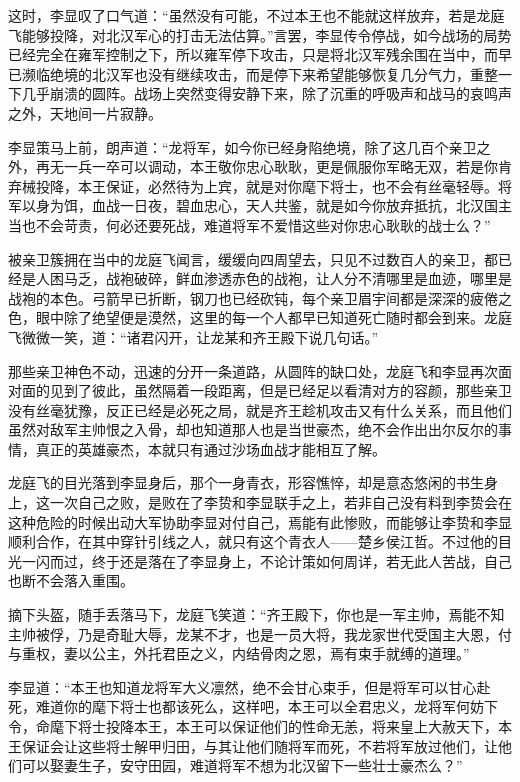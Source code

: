 这时，李显叹了口气道：“虽然没有可能，不过本王也不能就这样放弃，若是龙庭飞能够投降，对北汉军心的打击无法估算。”言罢，李显传令停战，如今战场的局势已经完全在雍军控制之下，所以雍军停下攻击，只是将北汉军残余围在当中，而早已濒临绝境的北汉军也没有继续攻击，而是停下来希望能够恢复几分气力，重整一下几乎崩溃的圆阵。战场上突然变得安静下来，除了沉重的呼吸声和战马的哀鸣声之外，天地间一片寂静。

李显策马上前，朗声道：“龙将军，如今你已经身陷绝境，除了这几百个亲卫之外，再无一兵一卒可以调动，本王敬你忠心耿耿，更是佩服你军略无双，若是你肯弃械投降，本王保证，必然待为上宾，就是对你麾下将士，也不会有丝毫轻辱。将军以身为饵，血战一日夜，碧血忠心，天人共鉴，就是如今你放弃抵抗，北汉国主当也不会苛责，何必还要死战，难道将军不爱惜这些对你忠心耿耿的战士么？”

被亲卫簇拥在当中的龙庭飞闻言，缓缓向四周望去，只见不过数百人的亲卫，都已经是人困马乏，战袍破碎，鲜血渗透赤色的战袍，让人分不清哪里是血迹，哪里是战袍的本色。弓箭早已折断，钢刀也已经砍钝，每个亲卫眉宇间都是深深的疲倦之色，眼中除了绝望便是漠然，这里的每一个人都早已知道死亡随时都会到来。龙庭飞微微一笑，道：“诸君闪开，让龙某和齐王殿下说几句话。”

那些亲卫神色不动，迅速的分开一条道路，从圆阵的缺口处，龙庭飞和李显再次面对面的见到了彼此，虽然隔着一段距离，但是已经足以看清对方的容颜，那些亲卫没有丝毫犹豫，反正已经是必死之局，就是齐王趁机攻击又有什么关系，而且他们虽然对敌军主帅恨之入骨，却也知道那人也是当世豪杰，绝不会作出出尔反尔的事情，真正的英雄豪杰，本就只有通过沙场血战才能相互了解。

龙庭飞的目光落到李显身后，那个一身青衣，形容憔悴，却是意态悠闲的书生身上，这一次自己之败，是败在了李贽和李显联手之上，若非自己没有料到李贽会在这种危险的时候出动大军协助李显对付自己，焉能有此惨败，而能够让李贽和李显顺利合作，在其中穿针引线之人，就只有这个青衣人——楚乡侯江哲。不过他的目光一闪而过，终于还是落在了李显身上，不论计策如何周详，若无此人苦战，自己也断不会落入重围。

摘下头盔，随手丢落马下，龙庭飞笑道：“齐王殿下，你也是一军主帅，焉能不知主帅被俘，乃是奇耻大辱，龙某不才，也是一员大将，我龙家世代受国主大恩，付与重权，妻以公主，外托君臣之义，内结骨肉之恩，焉有束手就缚的道理。”

李显道：“本王也知道龙将军大义凛然，绝不会甘心束手，但是将军可以甘心赴死，难道你的麾下将士也都该死么，这样吧，本王可以全君忠义，龙将军何妨下令，命麾下将士投降本王，本王可以保证他们的性命无恙，将来皇上大赦天下，本王保证会让这些将士解甲归田，与其让他们随将军而死，不若将军放过他们，让他们可以娶妻生子，安守田园，难道将军不想为北汉留下一些壮士豪杰么？”

